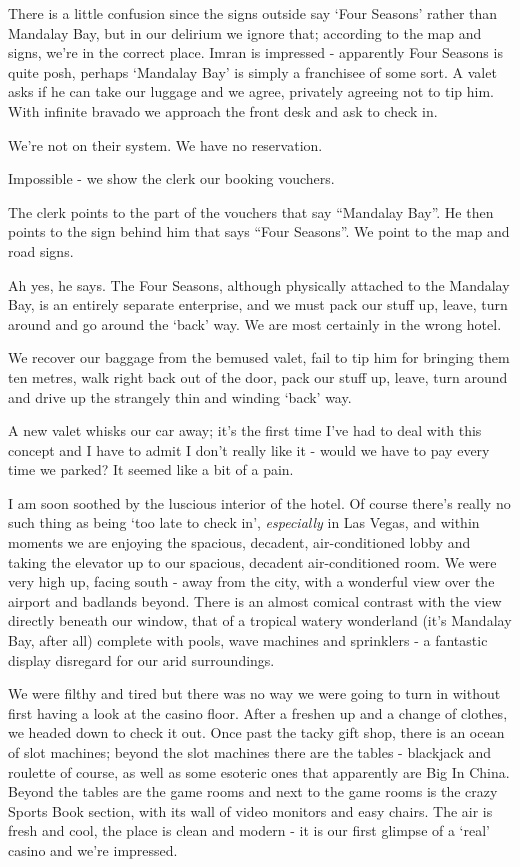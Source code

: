 \documentclass[a5paper,titlepage,11pt,draft]{book}
\begin{document}
There is a little confusion since the signs outside say `Four Seasons' rather than Mandalay Bay, but in our delirium we ignore that; according to the map and signs, we're in the correct place.  Imran is impressed - apparently Four Seasons is quite posh, perhaps `Mandalay Bay' is simply a franchisee of some sort.  A valet asks if he can take our luggage and we agree, privately agreeing not to tip him.  With infinite bravado we approach the front desk and ask to check in.

We're not on their system.  We have no reservation.

Impossible - we show the clerk our booking vouchers.

The clerk points to the part of the vouchers that say ``Mandalay Bay''.  He then points to the sign behind him that says ``Four Seasons''.  We point to the map and road signs.

Ah yes, he says.  The Four Seasons, although physically attached to the Mandalay Bay, is an entirely separate enterprise, and we must pack our stuff up, leave, turn around and go around the `back' way.  We are most certainly in the wrong hotel.

We recover our baggage from the bemused valet, fail to tip him for bringing them ten metres, walk right back out of the door, pack our stuff up, leave, turn around and drive up the strangely thin and winding `back' way.

A new valet whisks our car away; it's the first time I've had to deal with this concept and I have to admit I don't really like it - would we have to pay every time we parked?  It seemed like a bit of a pain.

I am soon soothed by the luscious interior of the hotel.  Of course there's really no such thing as being `too late to check in', \emph{especially} in Las Vegas, and within moments we are enjoying the spacious, decadent, air-conditioned lobby and taking the elevator up to our spacious, decadent air-conditioned room.  We were very high up, facing south - away from the city, with a wonderful view over the airport and badlands beyond.  There is an almost comical contrast with the view directly beneath our window, that of a tropical watery wonderland (it's Mandalay Bay, after all) complete with pools, wave machines and sprinklers - a fantastic display disregard for our arid surroundings.

We were filthy and tired but there was no way we were going to turn in without first having a look at the casino floor.  After a freshen up and a change of clothes, we headed down to check it out.  Once past the tacky gift shop, there is an ocean of slot machines; beyond the slot machines there are the tables - blackjack and roulette of course, as well as some esoteric ones that apparently are Big In China.  Beyond the tables are the game rooms and next to the game rooms is the crazy Sports Book section, with its wall of video monitors and easy chairs.  The air is fresh and cool, the place is clean and modern - it is our first glimpse of a `real' casino and we're impressed.
\end{document}
